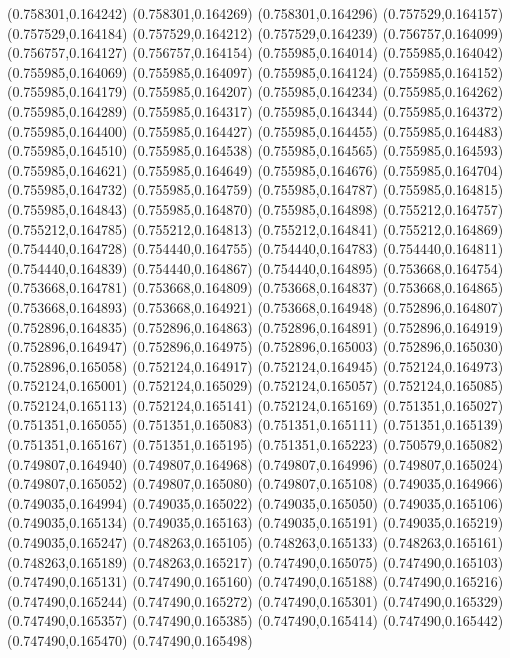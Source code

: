 (0.758301,0.164242)
(0.758301,0.164269)
(0.758301,0.164296)
(0.757529,0.164157)
(0.757529,0.164184)
(0.757529,0.164212)
(0.757529,0.164239)
(0.756757,0.164099)
(0.756757,0.164127)
(0.756757,0.164154)
(0.755985,0.164014)
(0.755985,0.164042)
(0.755985,0.164069)
(0.755985,0.164097)
(0.755985,0.164124)
(0.755985,0.164152)
(0.755985,0.164179)
(0.755985,0.164207)
(0.755985,0.164234)
(0.755985,0.164262)
(0.755985,0.164289)
(0.755985,0.164317)
(0.755985,0.164344)
(0.755985,0.164372)
(0.755985,0.164400)
(0.755985,0.164427)
(0.755985,0.164455)
(0.755985,0.164483)
(0.755985,0.164510)
(0.755985,0.164538)
(0.755985,0.164565)
(0.755985,0.164593)
(0.755985,0.164621)
(0.755985,0.164649)
(0.755985,0.164676)
(0.755985,0.164704)
(0.755985,0.164732)
(0.755985,0.164759)
(0.755985,0.164787)
(0.755985,0.164815)
(0.755985,0.164843)
(0.755985,0.164870)
(0.755985,0.164898)
(0.755212,0.164757)
(0.755212,0.164785)
(0.755212,0.164813)
(0.755212,0.164841)
(0.755212,0.164869)
(0.754440,0.164728)
(0.754440,0.164755)
(0.754440,0.164783)
(0.754440,0.164811)
(0.754440,0.164839)
(0.754440,0.164867)
(0.754440,0.164895)
(0.753668,0.164754)
(0.753668,0.164781)
(0.753668,0.164809)
(0.753668,0.164837)
(0.753668,0.164865)
(0.753668,0.164893)
(0.753668,0.164921)
(0.753668,0.164948)
(0.752896,0.164807)
(0.752896,0.164835)
(0.752896,0.164863)
(0.752896,0.164891)
(0.752896,0.164919)
(0.752896,0.164947)
(0.752896,0.164975)
(0.752896,0.165003)
(0.752896,0.165030)
(0.752896,0.165058)
(0.752124,0.164917)
(0.752124,0.164945)
(0.752124,0.164973)
(0.752124,0.165001)
(0.752124,0.165029)
(0.752124,0.165057)
(0.752124,0.165085)
(0.752124,0.165113)
(0.752124,0.165141)
(0.752124,0.165169)
(0.751351,0.165027)
(0.751351,0.165055)
(0.751351,0.165083)
(0.751351,0.165111)
(0.751351,0.165139)
(0.751351,0.165167)
(0.751351,0.165195)
(0.751351,0.165223)
(0.750579,0.165082)
(0.749807,0.164940)
(0.749807,0.164968)
(0.749807,0.164996)
(0.749807,0.165024)
(0.749807,0.165052)
(0.749807,0.165080)
(0.749807,0.165108)
(0.749035,0.164966)
(0.749035,0.164994)
(0.749035,0.165022)
(0.749035,0.165050)
(0.749035,0.165106)
(0.749035,0.165134)
(0.749035,0.165163)
(0.749035,0.165191)
(0.749035,0.165219)
(0.749035,0.165247)
(0.748263,0.165105)
(0.748263,0.165133)
(0.748263,0.165161)
(0.748263,0.165189)
(0.748263,0.165217)
(0.747490,0.165075)
(0.747490,0.165103)
(0.747490,0.165131)
(0.747490,0.165160)
(0.747490,0.165188)
(0.747490,0.165216)
(0.747490,0.165244)
(0.747490,0.165272)
(0.747490,0.165301)
(0.747490,0.165329)
(0.747490,0.165357)
(0.747490,0.165385)
(0.747490,0.165414)
(0.747490,0.165442)
(0.747490,0.165470)
(0.747490,0.165498)
